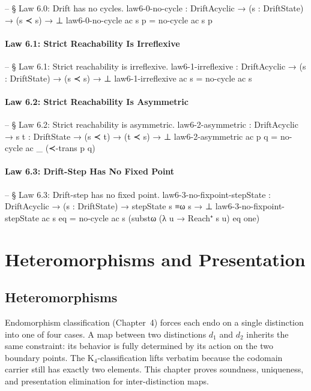 \documentclass[11pt,a4paper]{book}
\begin{document}
\begin{code}
-- § Law 6.0: Drift has no cycles.
law6-0-no-cycle : DriftAcyclic → (s : DriftState) → (s ≺ s) → ⊥
law6-0-no-cycle ac s p = no-cycle ac s p
\end{code}

\subsection{Law 6.1: Strict Reachability Is Irreflexive}

\begin{code}
-- § Law 6.1: Strict reachability is irreflexive.
law6-1-irreflexive : DriftAcyclic → (s : DriftState) → (s ≺ s) → ⊥
law6-1-irreflexive ac s = no-cycle ac s
\end{code}

\subsection{Law 6.2: Strict Reachability Is Asymmetric}

\begin{code}
-- § Law 6.2: Strict reachability is asymmetric.
law6-2-asymmetric :
  DriftAcyclic → {s t : DriftState} →
  (s ≺ t) → (t ≺ s) → ⊥
law6-2-asymmetric ac p q = no-cycle ac _ (≺-trans p q)
\end{code}

\subsection{Law 6.3: Drift-Step Has No Fixed Point}

\begin{code}
-- § Law 6.3: Drift-step has no fixed point.
law6-3-no-fixpoint-stepState : DriftAcyclic → (s : DriftState) → stepState s ≡ω s → ⊥
law6-3-no-fixpoint-stepState ac s eq =
  no-cycle ac s (substω (λ u → Reach⁺ s u) eq one)
\end{code}

\part{Heteromorphisms and Presentation}

\chapter{Heteromorphisms}

Endomorphism classification (Chapter~4) forces each endo on a single distinction into one of four cases. A map between two distinctions $d_1$ and $d_2$ inherits the same constraint: its behavior is fully determined by its action on the two boundary points. The K$_4$-classification lifts verbatim because the codomain carrier still has exactly two elements. This chapter proves soundness, uniqueness, and presentation elimination for inter-distinction maps.
\end{document}
